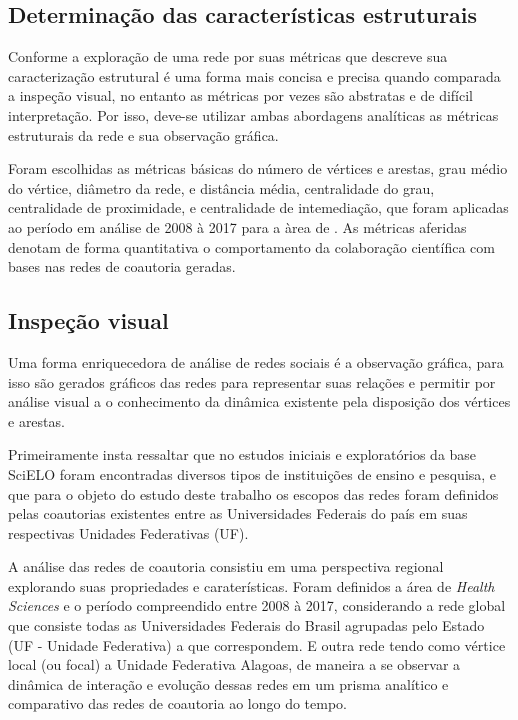 \documentclass[12pt]{article}
\begin{document}
\subsection{Determinação das características estruturais}

Conforme \cite{de2018exploratory} a exploração de uma rede por suas métricas que descreve sua caracterização estrutural é uma forma mais concisa e precisa quando comparada a inspeção visual, no entanto as métricas por vezes são abstratas e de difícil interpretação. Por isso, deve-se utilizar ambas abordagens analíticas as métricas estruturais da rede e sua observação gráfica.

Foram escolhidas as métricas básicas do número de vértices e arestas, grau médio do vértice, diâmetro da rede, e distância média, centralidade do grau, centralidade de proximidade, e centralidade de intemediação, que foram aplicadas ao período em análise de 2008 à 2017 para a àrea de . As métricas aferidas denotam de forma quantitativa o comportamento da colaboração científica com bases nas redes de coautoria geradas.

\subsection{Inspeção visual}

Uma forma enriquecedora de análise de redes sociais é a observação gráfica, para isso são gerados gráficos das redes para representar suas relações e permitir por análise visual a o conhecimento da dinâmica existente pela disposição dos vértices e arestas.

Primeiramente insta ressaltar que no estudos iniciais e exploratórios da base SciELO foram encontradas diversos tipos de instituições de ensino e pesquisa, e que para o objeto do estudo deste trabalho os escopos das redes foram definidos pelas coautorias existentes entre as Universidades Federais do país em suas respectivas Unidades Federativas (UF). 

A análise das redes de coautoria consistiu em uma perspectiva regional explorando suas propriedades e caraterísticas. Foram definidos a área de \textit{Health Sciences} e o período compreendido entre 2008 à 2017, considerando a rede global que consiste todas as Universidades Federais do Brasil agrupadas pelo Estado (UF - Unidade Federativa) a que correspondem. E outra rede tendo como vértice local (ou focal) a Unidade Federativa Alagoas, de maneira a se observar a dinâmica de interação e evolução dessas redes em um prisma analítico e comparativo das redes de coautoria ao longo do tempo.
\end{document}
